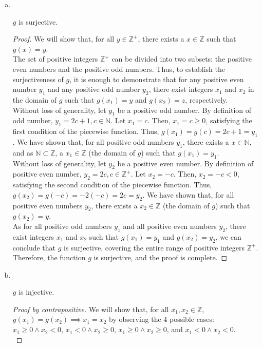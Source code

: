 \documentclass[11pt]{scrartcl}
\theoremstyle{dotlessP}
\theoremstyle{dotlessN}
\newcommand{\ints}{\mathbb{Z}}
\newcommand{\nats}{\mathbb{N}}
\begin{document}
\begin{enumerate}[(a)]
	\item  \
	\begin{claim*}
		$g$ is surjective.
	\end{claim*}
	\begin{proof}
		We will show that, for all $y \in \ints^+$, there exists a $x \in \ints$ such that $g(x) = y$.
		\\

The set of positive integers $\ints^+$ can be divided into two subsets: the positive even numbers and the positive odd numbers. Thus, to establish the surjectiveness of $g$, it is enough to demonstrate that for any positive even number $y_1$ and any positive odd number $y_2$, there exist integers $x_1$ and $x_2$ in the domain of $g$ such that $g(x_1) = y$ and $g(x_2) = z$, respectively.
\\

		Without loss of generality, let $y_1$ be a positive odd number. By definition of odd number, $y_1 = 2c + 1, c \in \nats$. Let  $x_1 = c$. Then, $x_1 = c \geq 0$, satisfying the first condition of the piecewise function. Thus, $g(x_1) = g(c) = 2c+1 = y_1$. We have shown that, for all positive odd numbers  $y_1$, there exists a $x \in \nats$, and as $\nats \subset \ints$, a $x_1 \in \ints$ (the domain of $g$) such that $g(x_1)=y_1$.
\\

		Without loss of generality, let $y_2$ be a positive even number. By definition of positive even number, $y_2 = 2c, c \in \ints^+$. Let  $x_2 = -c$. Then, $x_2 = -c < 0$, satisfying the second condition of the piecewise function. Thus, $g(x_2) = g(-c) = -2(-c) = 2c = y_2$. We have shown that, for all positive even numbers $y_2$, there exists a  $x_2 \in \ints$ (the domain of $g$) such that $g(x_2) = y$.
		\\

As for all positive odd numbers $y_1$ and all positive even numbers $y_2$, there exist integers $x_1$ and $x_2$ such that $g(x_1) = y_1$ and $g(x_2) = y_2$, we can conclude that $g$ is surjective, covering the entire range of positive integers $\ints^+$. Therefore, the function $g$ is surjective, and the proof is complete.
	\end{proof}
\item \
	\begin{claim*}
		$g$ is injective.
	\end{claim*}
	\begin{proof}
		[Proof by contrapositive]
		We will show that, for all $x_1, x_2 \in \ints$, $g(x_1) = g(x_2) \implies x_1 = x_2$ by observing the 4 possible cases: $x_1 \geq 0 \land x_2 < 0$, $x_1 < 0 \land x_2 \geq 0$, $x_1 \geq 0 \land x_2 \geq 0$, and $x_1 < 0 \land x_2 < 0$.
		\\


\end{proof}
\end{enumerate}
\end{document}
